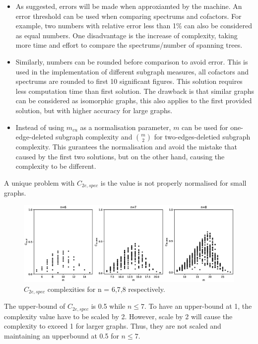 \documentclass[12pt]{article}
\begin{document}
\begin{itemize}
    \item As suggested, errors will be made when approxiamted by the machine. An error threshold can be used when comparing spectrums and cofactors. For example, two numbers with relative error less than 1\% can also be considered as equal numbers. One disadvantage is the increase of complexity, taking more time and effort to compare the spectrums/number of spanning trees.
    \item Similarly, numbers can be rounded before comparison to avoid error. This is used in the implementation of different subgraph measures, all cofactors and spectrums are rounded to first 10 significant figures. This solution requires less computation time than first solution. The drawback is that similar graphs can be considered as isomorphic graphs, this also applies to the first provided solution, but with higher accuracy for large graphs.
    \item Instead of using $m_{cu}$ as a normalisation parameter, $m$ can be used for one-edge-deleted subgraph complexity and $\genfrac(){0pt}{2}{m}{2}$ for two-edges-deletied subgraph complexity. This gurantees the normalisation and avoid the mistake that caused by the first two solutions, but on the other hand, causing the complexity to be different.
\end{itemize}
A unique problem with $C_{2e,spec}$ is the value is not properly normalised for small graphs.

\begin{figure}[ht]
    \includegraphics[width = \textwidth]{c2espec.eps}
    \caption{$C_{2e,spec}$ complexities for n = 6,7,8 respectively.}
    \centering
\end{figure}
\noindent
The upper-bound of $C_{2e,spec}$ is 0.5 while $ n\leq7 $. To have an upper-bound at 1, the complexity value have to be scaled by 2. However, scale by 2 will cause the complexity to exceed 1 for larger graphs. Thus, they are not scaled and maintaining an upperbound at 0.5 for $n \leq 7$.
\end{document}
